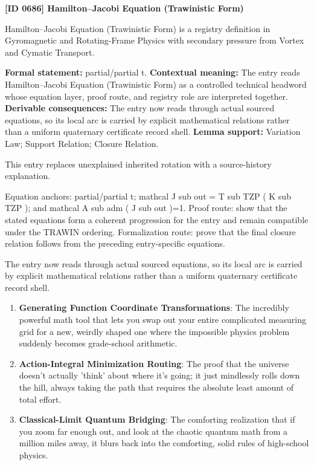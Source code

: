 \clearpage
\noindent\textbf{[ID 0686] Hamilton--Jacobi Equation (Trawinistic Form)}\par
\vspace{0.35em}
\begingroup\small
{}
Hamilton--Jacobi Equation (Trawinistic Form) is a registry definition in Gyromagnetic and Rotating-Frame Physics with secondary pressure from Vortex and Cymatic Transport.

\begingroup\footnotesize\setlength{\emergencystretch}{3em}\sloppy
\textbf{Formal statement:} partial/partial t. \textbf{Contextual meaning:} The entry reads Hamilton--Jacobi Equation (Trawinistic Form) as a controlled technical headword whose equation layer, proof route, and registry role are interpreted together. \textbf{Derivable consequences:} The entry now reads through actual sourced equations, so its local arc is carried by explicit mathematical relations rather than a uniform quaternary certificate record shell. \textbf{Lemma support:} Variation Law; Support Relation; Closure Relation.\par
\endgroup

This entry replaces unexplained inherited rotation with a source-history explanation.

Equation anchors: partial/partial t; mathcal J sub out = T sub TZP ( K sub TZP ); and mathcal A sub adm ( J sub out )=1. Proof route: show that the stated equations form a coherent progression for the entry and remain compatible under the TRAWIN ordering. Formalization route: prove that the final closure relation follows from the preceding entry-specific equations.

The entry now reads through actual sourced equations, so its local arc is carried by explicit mathematical relations rather than a uniform quaternary certificate record shell.
\endgroup

\begin{enumerate}[leftmargin=1.6em,itemsep=6pt,topsep=4pt]
\item \textbf{Generating Function Coordinate Transformations}: The incredibly powerful math tool that lets you swap out your entire complicated measuring grid for a new, weirdly shaped one where the impossible physics problem suddenly becomes grade-school arithmetic.
\item \textbf{Action-Integral Minimization Routing}: The proof that the universe doesn't actually 'think' about where it's going; it just mindlessly rolls down the hill, always taking the path that requires the absolute least amount of total effort.
\item \textbf{Classical-Limit Quantum Bridging}: The comforting realization that if you zoom far enough out, and look at the chaotic quantum math from a million miles away, it blurs back into the comforting, solid rules of high-school physics.
\end{enumerate}

